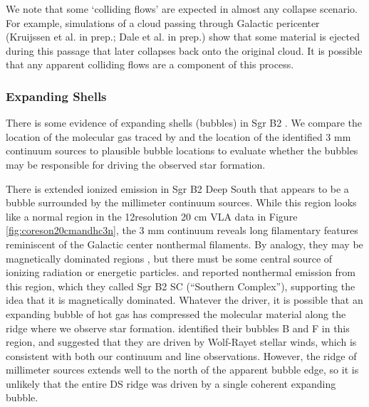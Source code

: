 \documentclass[twocolumn]{aastex61}
\begin{document}
We note that some `colliding flows' are expected in almost any collapse
scenario.  For example, simulations of a cloud passing through Galactic
pericenter (Kruijssen et al. in prep.; Dale et al. in prep.) show that some
material is ejected during this passage that later collapses back onto the
original cloud.  It is possible that any apparent colliding flows
\citep[e.g.,][]{Sato2000a} are a component of this process.

\subsubsection{Expanding Shells}
\label{sec:expandingshells}
There is some evidence of expanding shells (bubbles) in Sgr B2
\citep{de-Vicente1997a,Martin-Pintado1999a}.  We compare the location of the
molecular gas traced by \cyanoacetylene and the location of the identified 3 mm
continuum sources to plausible bubble locations to evaluate whether the bubbles
may be responsible for driving the observed star formation.


There is extended ionized emission in Sgr B2 Deep South that appears to be a
bubble surrounded by the millimeter continuum sources.  While this region looks
like a normal \hii region in the 12\arcsec resolution 20 cm
VLA data in Figure \ref{fig:coreson20cmandhc3n}, the 3 mm continuum reveals long
filamentary features reminiscent of the Galactic center nonthermal filaments.  By
analogy, they may be magnetically dominated regions
\citep[e.g.,][]{LaRosa2004a}, but there must be some
central source of ionizing radiation or energetic particles.
\citet{Jones2011a} and \citet{Protheroe2008a} reported nonthermal
emission from this region, which they called Sgr B2 SC (``Southern Complex''),
supporting the idea that it is magnetically dominated. 
Whatever the
driver, it is possible that an expanding bubble of hot gas has compressed the
molecular material along the ridge where we observe star formation.
\citet{Martin-Pintado1999a} identified their bubbles B and F in this region,
and suggested that they are driven by Wolf-Rayet stellar winds, which is
consistent with both our continuum and line observations.  However, the ridge
of millimeter sources extends well to the north of the apparent bubble edge, so
it is unlikely that the entire DS ridge was driven by a single coherent
expanding bubble.
\end{document}
